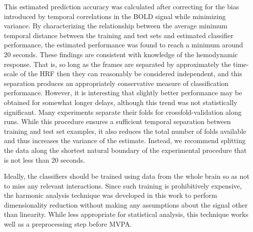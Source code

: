 \documentclass[preprint,5p,authoryear]{elsarticle}
\begin{document}
This estimated prediction accuracy was calculated after correcting for the bias introduced by temporal correlations in the BOLD signal while minimizing variance.
By characterizing the relationship between the average minimum temporal distance between the training and test sets and estimated classifier performance, the estimated performance was found to reach a minimum around 20 seconds.
These findings are consistent with knowledge of the hemodynamic response.
That is, so long as the frames are separated by approximately the time-scale of the HRF then they can reasonably be considered independent, and this separation produces an appropriately conservative measure of classification performance. 
However, it is interesting that slightly better performance may be obtained for somewhat longer delays, although this trend was not statistically significant.
Many experiments separate their folds for crossfold-validation along runs.
While this procedure ensures a sufficient temporal separation between training and test set examples, it also reduces the total number of folds available and thus increases the variance of the estimate.
Instead, we recommend splitting the data along the shortest natural boundary of the experimental procedure that is not less than 20 seconds.

Ideally, the classifiers should be trained using data from the whole brain so as not to miss any relevant interactions.
Since such training is prohibitively expensive, the harmonic analysis technique was developed in this work to perform dimensionality reduction without making any assumptions about the signal other than linearity.
While less appropriate for statistical analysis, this technique works well as a preprocessing step before MVPA.
\end{document}
